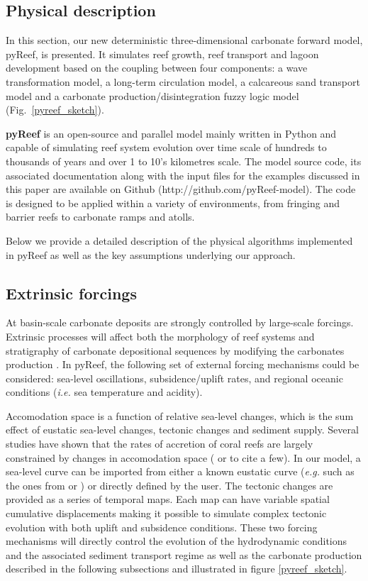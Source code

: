 \documentclass[default,jgrga]{agutex2015}
\begin{document}
\begin{article}
\section{Physical description}

In this section, our new deterministic three-dimensional carbonate forward model, pyReef, is presented. It simulates reef growth, reef transport and lagoon development based on the coupling between four components: a wave transformation model, a long-term circulation model, a calcareous sand transport model and a carbonate production/disintegration fuzzy logic model (Fig.~\ref{pyreef_sketch}).

\noindent \textbf{pyReef} is an open-source and parallel model mainly written in Python and capable of simulating reef system evolution over time scale of hundreds to thousands of years and over 1 to 10's kilometres scale. The model source code, its associated documentation along with the input files for the examples discussed in this paper are available on Github (http://github.com/pyReef-model). The code is designed to be applied within a variety of environments, from fringing and barrier reefs to carbonate ramps and atolls.

\noindent Below we provide a detailed description of the physical algorithms implemented in pyReef as well as the key assumptions underlying our approach.

\subsection{Extrinsic forcings}

At basin-scale carbonate deposits are strongly controlled by large-scale forcings. Extrinsic processes will affect both the morphology of reef systems and stratigraphy of carbonate depositional sequences by modifying the carbonates production \citep{Hill06}. In pyReef, the following set of external forcing mechanisms could be considered: sea-level oscillations, subsidence/uplift rates, and regional oceanic conditions (\textit{i.e.} sea temperature and acidity).

\noindent Accomodation space is a function of relative sea-level changes, which is the sum effect of eustatic sea-level changes, tectonic changes and sediment supply. Several studies have shown that the rates of accretion of coral reefs are largely constrained by changes in accomodation space (\citet{VanWoesik15} or \citet{Roff15} to cite a few). In our model, a sea-level curve can be imported from either a known eustatic curve (\textit{e.g.} such as the ones from \citet{Haq87} or \citet{Miller05}) or directly defined by the user. The tectonic changes are provided as a series of temporal maps. Each map can have variable spatial cumulative displacements making it possible to simulate complex tectonic evolution with both uplift and subsidence conditions. These two forcing mechanisms will directly control the evolution of the hydrodynamic conditions and the associated sediment transport regime as well as the carbonate production described in the following subsections and illustrated in figure \ref{pyreef_sketch}.


\end{article}
\end{document}
